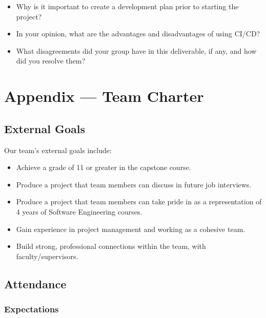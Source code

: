 \documentclass{article}
\begin{document}



\begin{itemize}
    \item Why is it important to create a development plan prior to starting the
    project?
    \item In your opinion, what are the advantages and disadvantages of using
    CI/CD?
    \item What disagreements did your group have in this deliverable, if any,
    and how did you resolve them?
\end{itemize}

\newpage{}

\section*{Appendix --- Team Charter}

\subsection*{External Goals}

Our team's external goals include:

\begin{itemize}
    \item Achieve a grade of 11 or greater in the capstone course.
    \item Produce a project that team members can discuss in future job interviews.
    \item Produce a project that team members can take pride in as a representation of 4 years of Software Engineering courses.
    \item Gain experience in project management and working as a cohesive team.
    \item Build strong, professional connections within the team, with faculty/supervisors.

\end{itemize}

\subsection*{Attendance}


\subsubsection*{Expectations}
\end{document}

